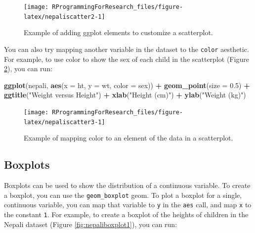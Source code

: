 \documentclass[]{book}
\makeatletter
\newenvironment{Shaded}{\begin{snugshade}}{\end{snugshade}}
\newcommand{\KeywordTok}[1]{\textcolor[rgb]{0.13,0.29,0.53}{\textbf{#1}}}
\newcommand{\DataTypeTok}[1]{\textcolor[rgb]{0.13,0.29,0.53}{#1}}
\newcommand{\FloatTok}[1]{\textcolor[rgb]{0.00,0.00,0.81}{#1}}
\newcommand{\StringTok}[1]{\textcolor[rgb]{0.31,0.60,0.02}{#1}}
\newcommand{\OperatorTok}[1]{\textcolor[rgb]{0.81,0.36,0.00}{\textbf{#1}}}
\newcommand{\NormalTok}[1]{#1}
\newenvironment{kframe}{%
\medskip{}
\setlength{\fboxsep}{.8em}
 \def\at@end@of@kframe{}%
 \ifinner\ifhmode%
  \def\at@end@of@kframe{\end{minipage}}%
  \begin{minipage}{\columnwidth}%
 \fi\fi%
 \def\FrameCommand##1{\hskip\@totalleftmargin \hskip-\fboxsep
 \colorbox{shadecolor}{##1}\hskip-\fboxsep
     \hskip-\linewidth \hskip-\@totalleftmargin \hskip\columnwidth}%
 \MakeFramed {\advance\hsize-\width
   \@totalleftmargin\z@ \linewidth\hsize
   \@setminipage}}%
 {\par\unskip\endMakeFramed%
 \at@end@of@kframe}
\renewenvironment{Shaded}{\begin{kframe}}{\end{kframe}}
\theoremstyle{definition}
\theoremstyle{definition}
\theoremstyle{definition}
\theoremstyle{remark}
\makeatother
\begin{document}
\begin{figure}

{\centering \texttt{[image: RProgrammingForResearch\_files/figure-latex/nepaliscatter2-1]} 

}

\caption{Example of adding ggplot elements to customize a scatterplot.}\label{fig:nepaliscatter2}
\end{figure}

You can also try mapping another variable in the dataset to the
\texttt{color} aesthetic. For example, to use color to show the sex of
each child in the scatterplot (Figure \ref{fig:nepaliscatter3}), you can
run:

\begin{Shaded}
\begin{Highlighting}[]
\KeywordTok{ggplot}\NormalTok{(nepali, }\KeywordTok{aes}\NormalTok{(}\DataTypeTok{x =}\NormalTok{ ht, }\DataTypeTok{y =}\NormalTok{ wt, }\DataTypeTok{color =}\NormalTok{ sex)) }\OperatorTok{+}\StringTok{ }
\StringTok{  }\KeywordTok{geom_point}\NormalTok{(}\DataTypeTok{size =} \FloatTok{0.5}\NormalTok{) }\OperatorTok{+}\StringTok{ }
\StringTok{  }\KeywordTok{ggtitle}\NormalTok{(}\StringTok{"Weight versus Height"}\NormalTok{) }\OperatorTok{+}\StringTok{ }
\StringTok{  }\KeywordTok{xlab}\NormalTok{(}\StringTok{"Height (cm)"}\NormalTok{) }\OperatorTok{+}\StringTok{ }\KeywordTok{ylab}\NormalTok{(}\StringTok{"Weight (kg)"}\NormalTok{)}
\end{Highlighting}
\end{Shaded}

\begin{figure}

{\centering \texttt{[image: RProgrammingForResearch\_files/figure-latex/nepaliscatter3-1]} 

}

\caption{Example of mapping color to an element of the data in a scatterplot.}\label{fig:nepaliscatter3}
\end{figure}

\subsection{Boxplots}\label{boxplots}

Boxplots can be used to show the distribution of a continuous variable.
To create a boxplot, you can use the \texttt{geom\_boxplot} geom. To
plot a boxplot for a single, continuous variable, you can map that
variable to \texttt{y} in the \texttt{aes} call, and map \texttt{x} to
the constant \texttt{1}. For example, to create a boxplot of the heights
of children in the Nepali dataset (Figure \ref{fig:nepaliboxplot1}), you
can run:
\end{document}
